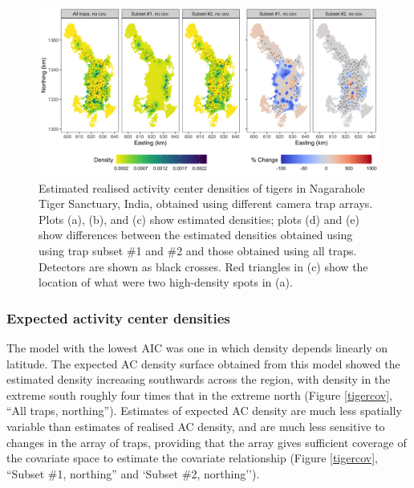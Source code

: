 \documentclass[10pt,a4paper]{article}
\begin{document}
\begin{figure}[htbp]
\centering
\includegraphics[width=1\textwidth]{tiger_surfaces_nocovs_v1.png}
\caption{Estimated realised activity center densities of tigers in Nagarahole Tiger Sanctuary, India, obtained using different camera trap arrays. Plots (a), (b), and (c) show estimated densities; plots (d) and (e) show differences between the estimated densities obtained using using trap subset \#1 and \#2 and those obtained using all traps. Detectors are shown as black crosses. Red triangles in (c) show the location of what were two high-density spots in (a).}
\label{tigernocov}
\end{figure}

\subsubsection{Expected activity center densities}

The model with the lowest AIC was one in which density depends linearly on latitude. The expected AC density surface obtained from this model showed the estimated density increasing southwards across the region, with density in the extreme south roughly four times that in the extreme north (Figure \ref{tigercov}, ``All traps, northing''). Estimates of expected AC density are much less spatially variable than estimates of realised AC density, and are much less sensitive to changes in the array of traps, providing that the array gives sufficient coverage of the covariate space to estimate the covariate relationship (Figure \ref{tigercov}, ``Subset \#1, northing'' and `Subset \#2, northing''). 
\end{document}

